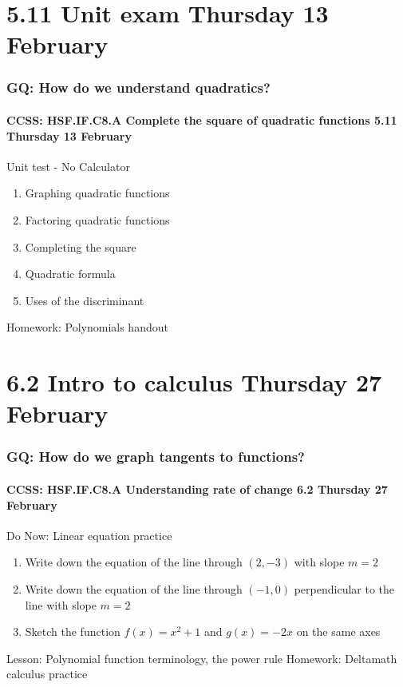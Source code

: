\documentclass{beamer}
\begin{document}
\section{5.11 Unit exam \hfill Thursday 13 February}
\frame
{
  \frametitle{GQ: How do we understand quadratics?}
  \framesubtitle{CCSS: HSF.IF.C8.A Complete the square of quadratic functions \hfill \alert{5.11  Thursday 13 February}}

  \begin{block}{Unit test - No Calculator}
    \begin{enumerate}
      \item Graphing quadratic functions
      \item Factoring quadratic functions
      \item Completing the square
      \item Quadratic formula
      \item Uses of the discriminant
    \end{enumerate}
    \end{block}
    Homework: Polynomials handout
    }

  \section{6.2 Intro to calculus \hfill Thursday 27 February}
  \frame
  {
    \frametitle{GQ: How do we graph tangents to functions?}
    \framesubtitle{CCSS: HSF.IF.C8.A Understanding rate of change \hfill \alert{6.2  Thursday 27 February}}

    \begin{block}{Do Now: Linear equation practice}
      \begin{enumerate}
        \item Write down the equation of the line through $(2,-3)$ with slope $m=2$
        \item Write down the equation of the line through $(-1,0)$ perpendicular to the line with slope $m=2$
        \item Sketch the function $f(x)=x^2+1$ and $g(x)=-2x$ on the same axes
      \end{enumerate}
      \end{block}
      Lesson: Polynomial function terminology, the power rule
      Homework: Deltamath calculus practice
      }
\end{document}
